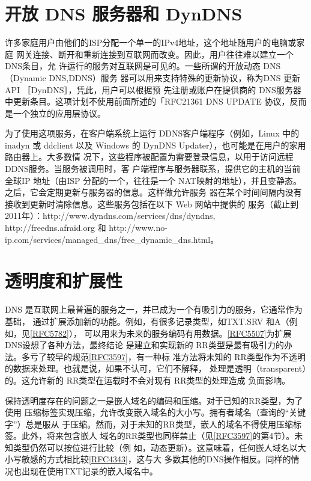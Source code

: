 \section{开放 DNS 服务器和 DynDNS}

许多家庭用户由他们的ISP分配一个单一的IPv4地址，这个地址随用户的电脑或家庭
网关连接、断开和重新连接到互联网而改变。因此，用户往往难以建立一个 DNS条目，允
许运行的服务对互联网是可见的。一些所谓的开放动态 DNS（Dynamic DNS,DDNS）服务
器可以用来支持特殊的更新协议，称为DNS 更新 API ［DynDNS］，凭此，用户可以根据预
先注册或账户在提供商的 DNS服务器中更新条目。这项计划不使用前面所述的「RFC21361
DNS UPDATE 协议，反而是一个独立的应用层协议。

为了使用这项服务，在客户端系统上运行 DDNS客户端程序（例如，Linux 中的 inadyn
或 ddclient 以及 Windows 的 DynDNS Updater），也可能是在用户的家用路由器上。大多数情
况下，这些程序被配置为需要登录信息，以用于访问远程DDNS服务。当服务被调用时，客
户端程序与服务器联系，提供它的主机的当前全球IP 地址（由ISP 分配的一个，往往是一个
NAT映射的地址），并且变静态。之后，它会定期更新与服务器的信息。这样做允许服务
器在某个时间间隔内没有接收到更新时清除信息。这些服务包括在以下 Web 网站中提供的
服务（截止到2011年）：http://www.dyndns.com/services/dns/dyndns, http://freedns.afraid.org
和 http://www.no-ip.com/services/managed\_dns/free\_dynamic\_dns.html。

\section{透明度和扩展性}

DNS 是互联网上最普遍的服务之一，并已成为一个有吸引力的服务，它通常作为基础，
通过扩展添加新的功能。例如，有很多记录类型，如TXT.SRV 和A（例如，见\href{https://www.rfc-editor.org/rfc/rfc5782}{[RFC5782]}），
可以用来为未来的服务编码有用数据。\href{https://www.rfc-editor.org/rfc/rfc5507}{[RFC5507]}为扩展 DNS设想了各种方法，最终结论
是建立和实现新的 RR类型是最有吸引力的办法。多亏了较早的规范\href{https://www.rfc-editor.org/rfc/rfc3597}{[RFC3597]}，有一种标
准方法将未知的 RR类型作为不透明的数据来处理。也就是说，如果不认可，它们不解释，
处理是透明（transparent）的。这允许新的 RR类型在运载时不会对现有 RR类型的处理造成
负面影响。

保持透明度存在的问题之一是嵌人域名的编码和压缩。对于已知的RR类型，为了使用
压缩标签实现压缩，允许改变嵌入域名的大小写。拥有者域名（查询的“关键字”）总是服从
于压缩。然而，对于未知的RR类型，嵌人的域名不得使用压缩标签。此外，将来包含嵌人
域名的RR类型也同样禁止（见\href{https://www.rfc-editor.org/rfc/rfc3597}{[RFC3597]}的第4节）。未知类型仍然可以按位进行比较（例
如，动态更新）。这意味着，任何嵌人域名以大小写敏感的方式相比较\href{https://www.rfc-editor.org/rfc/rfc4343}{[RFC4343]}，这与大
多数其他的DNS操作相反。同样的情况也出现在使用TXT记录的嵌入域名中。

